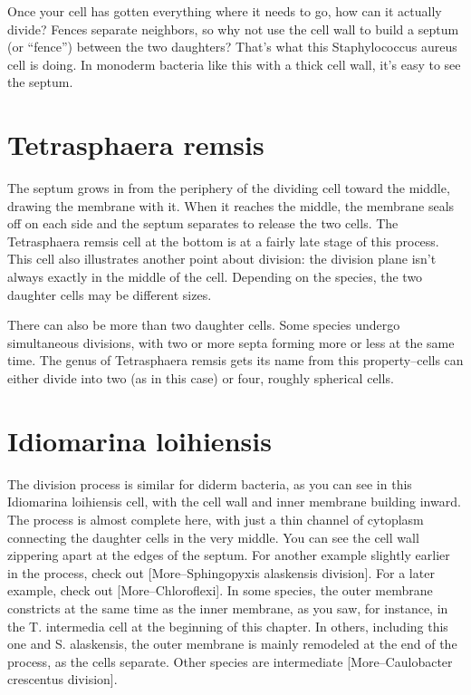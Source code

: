 \documentclass[]{tufte-book}
\begin{document}
Once your cell has gotten everything where it needs to go, how can it
actually divide? Fences separate neighbors, so why not use the cell wall
to build a septum (or ``fence'') between the two daughters? That's what
this Staphylococcus aureus cell is doing. In monoderm bacteria like this
with a thick cell wall, it's easy to see the septum.

\section{Tetrasphaera remsis}\label{tetrasphaera-remsis}

The septum grows in from the periphery of the dividing cell toward the
middle, drawing the membrane with it. When it reaches the middle, the
membrane seals off on each side and the septum separates to release the
two cells. The Tetrasphaera remsis cell at the bottom is at a fairly
late stage of this process. This cell also illustrates another point
about division: the division plane isn't always exactly in the middle of
the cell. Depending on the species, the two daughter cells may be
different sizes.

There can also be more than two daughter cells. Some species undergo
simultaneous divisions, with two or more septa forming more or less at
the same time. The genus of Tetrasphaera remsis gets its name from this
property--cells can either divide into two (as in this case) or four,
roughly spherical cells.

\section{Idiomarina loihiensis}\label{idiomarina-loihiensis}

The division process is similar for diderm bacteria, as you can see in
this Idiomarina loihiensis cell, with the cell wall and inner membrane
building inward. The process is almost complete here, with just a thin
channel of cytoplasm connecting the daughter cells in the very middle.
You can see the cell wall zippering apart at the edges of the septum.
For another example slightly earlier in the process, check out
{[}More--Sphingopyxis alaskensis division{]}. For a later example, check
out {[}More--Chloroflexi{]}. In some species, the outer membrane
constricts at the same time as the inner membrane, as you saw, for
instance, in the T. intermedia cell at the beginning of this chapter. In
others, including this one and S. alaskensis, the outer membrane is
mainly remodeled at the end of the process, as the cells separate. Other
species are intermediate {[}More--Caulobacter crescentus division{]}.
\end{document}
